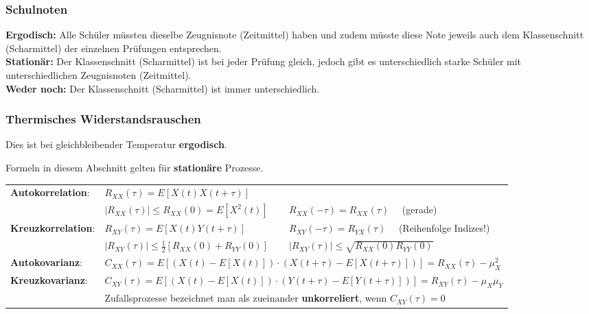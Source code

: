 \subsubsection{Schulnoten}
\textbf{Ergodisch:} Alle Schüler müssten dieselbe Zeugnisnote (Zeitmittel) haben und zudem müsste
diese Note jeweils auch dem Klassenschnitt (Scharmittel) der einzelnen Prüfungen entsprechen. \\
\textbf{Stationär:} Der Klassenschnitt (Scharmittel) ist bei jeder Prüfung gleich, jedoch gibt es
unterschiedlich starke Schüler mit unterschiedlichen Zeugnisnoten (Zeitmittel). \\
\textbf{Weder noch:} Der Klassenschnitt (Scharmittel) ist immer unterschiedlich.

\subsubsection{Thermisches Widerstandsrauschen} 
Dies ist bei gleichbleibender Temperatur \textbf{ergodisch}.


Formeln in diesem Abschnitt gelten für \textbf{stationäre} Prozesse. \\

\renewcommand{\arraystretch}{1.6}
\begin{tabular}[c]{ p{4cm}  p{6cm} p{7.5cm} }
	\textbf{Autokorrelation}: 	&  
	$R_{XX}(\tau) = E[X(t)X(t+\tau)]$ \\
  	&	$\mid \! R_{XX}(\tau) \! \mid \leq R_{XX}(0) = E[X^{2}(t)]$ 
	& $R_{XX}(-\tau) = R_{XX}(\tau) \quad$ (gerade)\\
  \textbf{Kreuzkorrelation}: 	& 	
 	$R_{XY}(\tau) = E[X(t)Y(t+\tau)]$  
	& $R_{XY}(-\tau) = R_{YX}(\tau) \quad$ (Reihenfolge Indizes!) \\
	& $|R_{XY}(\tau)| \leq \frac{1}{2} \left[ R_{XX}(0)+R_{YY}(0)\right] $
	& $|R_{XY}(\tau)|  \leq \sqrt{R_{XX}(0)R_{YY}(0)}$ \\
   \textbf{Autokovarianz}: 	&  
	\multicolumn{2}{l}{$C_{XX}(\tau) = E\!\left[ \left( X(t)      - E[X(t)]      \right) \cdot
                                  \left( X(t+\tau) - E[X(t+\tau)] \right) \right] =
                        R_{XX}(\tau) - \mu^{2}_{X} $} \\
   	\textbf{Kreuzkovarianz}: 	& 	
   	\multicolumn{2}{l}{$C_{XY}(\tau) = E\!\left[ \left( X(t)      - E[X(t)]      \right) \cdot
                                  \left( Y(t+\tau) - E[Y(t+\tau)] \right) \right] =
                        R_{XY}(\tau) - \mu_{X}\mu_{Y} $}\\
    & \multicolumn{2}{l}{Zufallsprozesse bezeichnet man als zueinander
                        \textbf{unkorreliert}, wenn $C_{XY}(\tau) = 0$}
\end{tabular}
\renewcommand{\arraystretch}{1}

